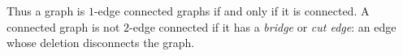 

\setcounter{section}{3}
\setcounter{subsection}{4}
\setcounter{dfn}{12}

Thus a graph is $1$-edge connected graphs if and only if it is connected.
A connected graph is not $2$-edge connected if it has a \emph{bridge} or \emph{cut edge}: an edge whose deletion disconnects the graph.



